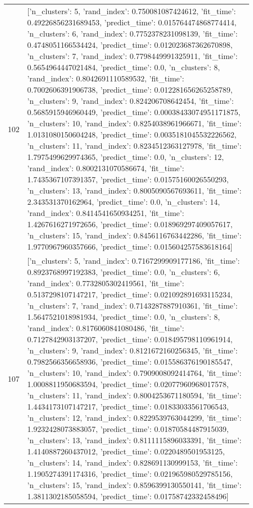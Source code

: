 \begin{tabular}{rl}
102 & [{'n_clusters': 5, 'rand_index': 0.750081087424612, 'fit_time': 0.49226856231689453, 'predict_time': 0.015764474868774414}, {'n_clusters': 6, 'rand_index': 0.7752378231098139, 'fit_time': 0.4748051166534424, 'predict_time': 0.012023687362670898}, {'n_clusters': 7, 'rand_index': 0.7798449991325911, 'fit_time': 0.5654964447021484, 'predict_time': 0.0}, {'n_clusters': 8, 'rand_index': 0.8042691110589532, 'fit_time': 0.7002606391906738, 'predict_time': 0.012281656265258789}, {'n_clusters': 9, 'rand_index': 0.824206708642454, 'fit_time': 0.5685915946960449, 'predict_time': 0.00038433074951171875}, {'n_clusters': 10, 'rand_index': 0.8254038961966671, 'fit_time': 1.0131080150604248, 'predict_time': 0.0035181045532226562}, {'n_clusters': 11, 'rand_index': 0.8234512363127978, 'fit_time': 1.7975499629974365, 'predict_time': 0.0}, {'n_clusters': 12, 'rand_index': 0.8002131070586674, 'fit_time': 1.7435367107391357, 'predict_time': 0.01575160026550293}, {'n_clusters': 13, 'rand_index': 0.8005090567693611, 'fit_time': 2.343531370162964, 'predict_time': 0.0}, {'n_clusters': 14, 'rand_index': 0.8414541650934251, 'fit_time': 1.4267616271972656, 'predict_time': 0.018969297409057617}, {'n_clusters': 15, 'rand_index': 0.8456116763442286, 'fit_time': 1.9770967960357666, 'predict_time': 0.015604257583618164}] \\
107 & [{'n_clusters': 5, 'rand_index': 0.7167299909177186, 'fit_time': 0.8923768997192383, 'predict_time': 0.0}, {'n_clusters': 6, 'rand_index': 0.7732805302419561, 'fit_time': 0.5137298107147217, 'predict_time': 0.021092891693115234}, {'n_clusters': 7, 'rand_index': 0.7143287887910361, 'fit_time': 1.5647521018981934, 'predict_time': 0.0}, {'n_clusters': 8, 'rand_index': 0.8176060841080486, 'fit_time': 0.7127842903137207, 'predict_time': 0.018495798110961914}, {'n_clusters': 9, 'rand_index': 0.8121672160256345, 'fit_time': 0.7982566356658936, 'predict_time': 0.015586376190185547}, {'n_clusters': 10, 'rand_index': 0.7909008092414764, 'fit_time': 1.0008811950683594, 'predict_time': 0.02077960968017578}, {'n_clusters': 11, 'rand_index': 0.8004253671180594, 'fit_time': 1.4434173107147217, 'predict_time': 0.01833033561706543}, {'n_clusters': 12, 'rand_index': 0.8229539763044299, 'fit_time': 1.9232428073883057, 'predict_time': 0.01870584487915039}, {'n_clusters': 13, 'rand_index': 0.8111115896033391, 'fit_time': 1.4140887260437012, 'predict_time': 0.0220489501953125}, {'n_clusters': 14, 'rand_index': 0.828691130999153, 'fit_time': 1.1905274391174316, 'predict_time': 0.021965980529785156}, {'n_clusters': 15, 'rand_index': 0.8596399130550141, 'fit_time': 1.3811302185058594, 'predict_time': 0.01758742332458496}] \\

\end{tabular}
